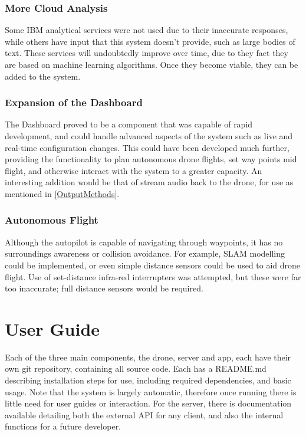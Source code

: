\documentclass{article}
\begin{document}
\subsubsection{More Cloud Analysis}
Some IBM analytical services were not used due to their inaccurate responses, while others have input that this system doesn't provide, such as large bodies of text. These services will undoubtedly improve over time, due to they fact they are based on machine learning algorithms. Once they become viable, they can be added to the system.
 
\subsubsection{Expansion of the Dashboard}
The Dashboard proved to be a component that was capable of rapid development, and could handle advanced aspects of the system such as live and real-time configuration changes. This could have been developed much further, providing the functionality to plan autonomous drone flights, set way points mid flight, and otherwise interact with the system to a greater capacity. An interesting addition would be that of stream audio back to the drone, for use as mentioned in \ref{OutputMethods}.

\subsubsection{Autonomous Flight}
Although the autopilot is capable of navigating through waypoints, it has no surroundings awareness or collision avoidance. For example, SLAM modelling could be implemented, or even simple distance sensors could be used to aid drone flight. Use of set-distance infra-red interrupters was attempted, but these were far too inaccurate; full distance sensors would be required. 

\section{User Guide}\label{UserGuide}
Each of the three main components, the drone, server and app, each have their own git repository, containing all source code. Each has a README.md describing installation steps for use, including required dependencies, and basic usage. Note that the system is largely automatic, therefore once running there is little need for user guides or interaction. For the server, there is documentation available detailing both the external API for any client, and also the internal functions for a future developer. 
\end{document}
